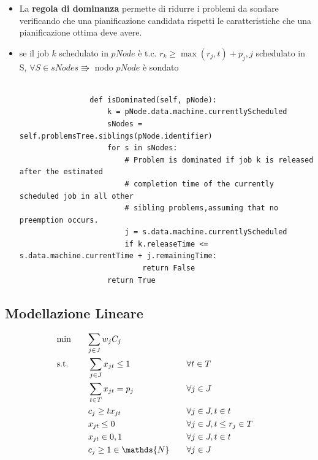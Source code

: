 \documentclass[compress]{beamer}
\begin{document}
    \begin{frame}[fragile]{\subsecname}
        \begin{itemize}
            \item La \textbf{regola di dominanza} permette di ridurre i problemi da sondare verificando
            che una pianificazione candidata rispetti le caratteristiche che una 
            pianificazione ottima deve avere.
            \item se il job $k$ schedulato in $pNode$ è t.c. $r_k \geq \max(r_j, t) + p_j, j$ schedulato in S, $\forall S \in sNodes \Rrightarrow $ nodo $pNode$ è sondato
            \vfill
            \begin{verbatim}
                                                    
                def isDominated(self, pNode):
                    k = pNode.data.machine.currentlyScheduled        
                    sNodes = self.problemsTree.siblings(pNode.identifier)
                    for s in sNodes:
                        # Problem is dominated if job k is released after the estimated
                        # completion time of the currently scheduled job in all other
                        # sibling problems,assuming that no preemption occurs.
                        j = s.data.machine.currentlyScheduled
                        if k.releaseTime <= s.data.machine.currentTime + j.remainingTime:
                            return False
                    return True
            \end{verbatim}
        \end{itemize}
    \end{frame}

    \subsection{Modellazione Lineare}
    \begin{frame}{\subsecname}
        
        \begin{alignat}{4}
          & \text{min} \quad && \mathrlap{\sum_{j \in J} w_j C_j } \\ %
          & \text{s.t.} \quad && \sum_{j \in J} x_{jt} \leq 1 \quad && \forall t \in T \\
          & && \sum_{t \in T} x_{jt} = p_j \quad && \forall j \in J \\
          & && c_j \geq tx_{jt} \quad && \forall j \in J, t \in t \\
          & && x_{jt} \leq 0 \quad && \forall j \in J, t \leq r_j \in T\\
          & && x_{jt} \in {0, 1} \quad && \forall j \in J, t \in t\\
          & && c_j \geq 1 \in \mathds{N} \quad && \forall j \in J 
        \end{alignat}
    \end{frame}
\end{document}
